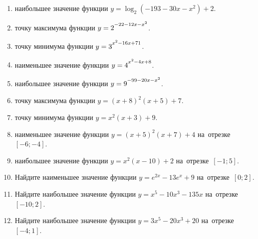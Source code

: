 \documentclass[a4paper,10pt]{article}
\begin{document}
\begin{enumerate}
\item {} наибольшее значение функции $y=\log_2\left(-193-30x-x^2\right)+2$.

\item {} точку максимума функции $y=2\strut^{-22-12x-x^2}$.

\item {} точку минимума функции $y=3\strut^{x^2-16x+71}$.

\item {} наименьшее значение функции $y=4\strut^{x^2-4x+8}$.

\item {} наибольшее значение функции $y=9\strut^{-99-20x-x^2}$.

\item {} точку максимума функции $y=\left(x+8\right)^2\left(x+5\right)+7$.

\item {} точку минимума функции $y=x^2\left(x+3\right)+9$.

\item {} наименьшее значение функции $y=\left(x+5\right)^2\left(x+7\right)+4$ на~отрезке~$\left[-6;-4\right]$.

\item {} наибольшее значение функции $y=x^2\left(x-10\right)+2$ на~отрезке~$\left[-1;5\right]$.

\item Найдите наименьшее значение функции $y=e^{2x}-13e^x+9$ на~отрезке~$\left[0;2\right]$.

\item Найдите наибольшее значение функции $y=x^5-10x^3-135x$ на~отрезке~$\left[-10;2\right]$.

\item Найдите наибольшее значение функции $y=3x^5-20x^3+20$ на~отрезке~$\left[-4;1\right]$.

\end{enumerate}
\end{document}
